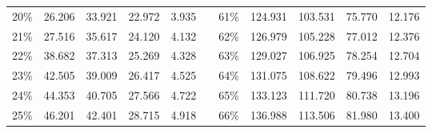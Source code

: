 \documentclass[12pt]{article}
\begin{document}
\begin{center}
\begin{tabular}{|c|r|r|r|r|r|c|r|r|r|r|}
    20\%                      & 26.206                             & 33.921                              & 22.972                              & 3.935                              &                                & 61\%                      & 124.931                            & 103.531                             & 75.770                              & 12.176                             \\ \cline{1-5} \cline{7-11} 
    21\%                      & 27.516                             & 35.617                              & 24.120                              & 4.132                              &                                & 62\%                      & 126.979                            & 105.228                             & 77.012                              & 12.376                             \\ \cline{1-5} \cline{7-11} 
    22\%                      & 38.682                             & 37.313                              & 25.269                              & 4.328                              &                                & 63\%                      & 129.027                            & 106.925                             & 78.254                              & 12.704                             \\ \cline{1-5} \cline{7-11} 
    23\%                      & 42.505                             & 39.009                              & 26.417                              & 4.525                              &                                & 64\%                      & 131.075                            & 108.622                             & 79.496                              & 12.993                             \\ \cline{1-5} \cline{7-11} 
    24\%                      & 44.353                             & 40.705                              & 27.566                              & 4.722                              &                                & 65\%                      & 133.123                            & 111.720                             & 80.738                              & 13.196                             \\ \cline{1-5} \cline{7-11} 
    25\%                      & 46.201                             & 42.401                              & 28.715                              & 4.918                              &                                & 66\%                      & 136.988                            & 113.506                             & 81.980                              & 13.400                             \\ \cline{1-5} \cline{7-11} 

\end{tabular}
\end{center}
\end{document}
